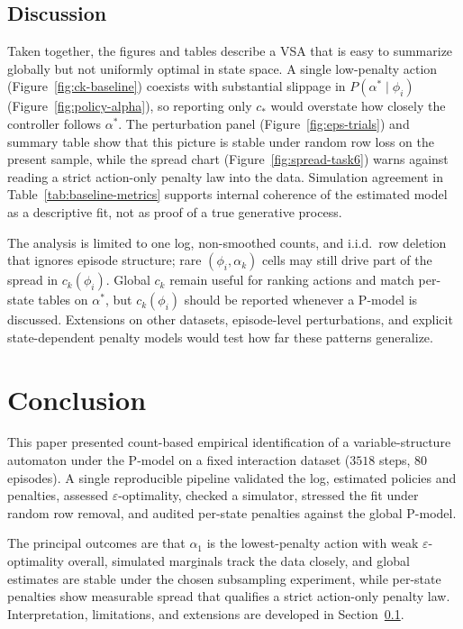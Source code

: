 \documentclass[11pt,a4paper]{article}
\begin{document}
\subsection{Discussion}\label{sec:discussion}

Taken together, the figures and tables describe a VSA that is easy to summarize
globally but not uniformly optimal in state space. A single low-penalty action
(Figure~\ref{fig:ck-baseline}) coexists with substantial slippage in
$P(\alpha^\ast\mid\phi_i)$ (Figure~\ref{fig:policy-alpha}), so reporting only
$c_\ast$ would overstate how closely the controller follows $\alpha^\ast$. The
perturbation panel (Figure~\ref{fig:eps-trials}) and summary table show that this
picture is stable under random row loss on the present sample, while the spread
chart (Figure~\ref{fig:spread-task6}) warns against reading a strict action-only
penalty law into the data. Simulation agreement in Table~\ref{tab:baseline-metrics}
supports internal coherence of the estimated model as a descriptive fit, not as
proof of a true generative process.

The analysis is limited to one log, non-smoothed counts, and i.i.d.\ row deletion that
ignores episode structure; rare $(\phi_i,\alpha_k)$ cells may still drive part of the
spread in $c_k(\phi_i)$. Global $c_k$ remain useful for ranking actions and match
per-state tables on $\alpha^\ast$, but $c_k(\phi_i)$ should be reported whenever a
P-model is discussed. Extensions on other datasets, episode-level perturbations, and
explicit state-dependent penalty models would test how far these patterns generalize.

\section{Conclusion}\label{sec:conclusion}

This paper presented count-based empirical identification of a variable-structure
automaton under the P-model on a fixed interaction dataset ($3518$ steps,
$80$ episodes). A single reproducible pipeline validated the log, estimated policies
and penalties, assessed $\varepsilon$-optimality, checked a simulator, stressed the
fit under random row removal, and audited per-state penalties against the global
P-model.

The principal outcomes are that $\alpha_1$ is the lowest-penalty action with weak
$\varepsilon$-optimality overall, simulated marginals track the data closely, and
global estimates are stable under the chosen subsampling experiment, while per-state
penalties show measurable spread that qualifies a strict action-only penalty law.
Interpretation, limitations, and extensions are developed in
Section~\ref{sec:discussion}.
\end{document}

